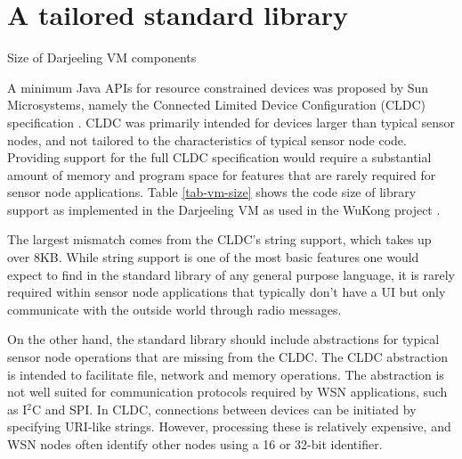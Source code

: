 \section{A tailored standard library}
\label{sec-std-lib}
\begin{table}
    \centering
    \caption{Size of Darjeeling VM components}
    \scriptsize
    \label{tab-vm-size}
     
\end{table}

A minimum Java APIs for resource constrained devices was proposed by Sun Microsystems, namely the Connected Limited Device Configuration (CLDC) specification \cite{CLDC}. CLDC was primarily intended for devices larger than typical sensor nodes, and not tailored to the characteristics of typical sensor node code. Providing support for the full CLDC specification would require a substantial amount of memory and program space for features that are rarely required for sensor node applications. Table \ref{tab-vm-size} shows the code size of library support as implemented in the Darjeeling VM as used in the WuKong project \cite{Reijers:2013ut}.

The largest mismatch comes from the CLDC's string support, which takes up over 8KB. While string support is one of the most basic features one would expect to find in the standard library of any general purpose language, it is rarely required within sensor node applications that typically don't have a UI but only communicate with the outside world through radio messages.


On the other hand, the standard library should include abstractions for typical sensor node operations that are missing from the CLDC. The CLDC  abstraction is intended to facilitate file, network and memory operations. The abstraction is not well suited for communication protocols required by WSN applications, such as I$^{2}$C and SPI. In CLDC, connections between devices can be initiated by specifying URI-like strings. However, processing these is relatively expensive, and WSN nodes often identify other nodes using a 16 or 32-bit identifier.


